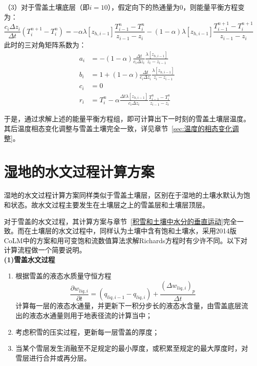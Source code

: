 （3）对于雪盖土壤底层（即$i=10$），假定向下的热通量为0，则能量平衡方程变为：
\begin{equation}
    \frac{c_{i} \Delta z_{i}}{\Delta t}\left(T_{i}^{n+1}-T_{i}^{n}\right)=-\alpha \lambda\left[z_{h, i-1}\right] \frac{T_{i-1}^{n}-T_{i}^{n}}{z_{i-1}-z_{i}}-(1-\alpha) \lambda\left[z_{h, i-1}\right] \frac{T_{i-1}^{n+1}-T_{i}^{n+1}}{z_{i-1}-z_{i}}
\end{equation}
此时的三对角矩阵系数为：
\begin{equation}
\begin{aligned}
a_{i} &= -(1-\alpha) \frac{\Delta t}{c_{i} \Delta z_{i}} \frac{\lambda\left[z_{h, i-1}\right]}{z_{i}-z_{i-1}} \\
b_{i} &= 1+(1-\alpha) \frac{\Delta t}{c_{i} \Delta z_{i}} \frac{\lambda\left[z_{h, i-1}\right]}{z_{i}-z_{i-1}} \\
c_{i} &= 0 \\
r_{i} &= T_{i}^{n}-\alpha \frac{\Delta t \lambda\left[z_{h, i-1}\right]}{c_{i} \Delta z_{i}} \frac{T_{i-1}^{n}-T_{i}^{n}}{z_{i-1}-z_{i}}
\end{aligned}
\end{equation}

于是，通过求解上述的能量平衡方程组，即可计算出下一时刻的雪盖土壤层温度。其后温度相态变化调整与雪盖土壤完全一致，详见章节~\ref{sec:温度的相态变化调整}。


\section{湿地的水文过程计算方案}
湿地的水文过程计算方案同样类似于雪盖土壤层，区别在于湿地的土壤水默认为饱和状态。故水文过程主要发生在土壤层之上的雪盖层和土壤层顶层。

对于雪盖的水文过程，其计算方案与章节~\ref{积雪和土壤中水分的垂直运动}完全一致。而在土壤层的水文过程中，同样认为土壤中含有饱和土壤水，采用2014版CoLM中的方案和用可变饱和流数值算法求解Richards方程时有少许不同。以下对计算流程做一个简要说明。\\

\textbf {(1)雪盖水文过程}\\

\begin{enumerate}
    \item 根据雪盖的液态水质量守恒方程
    \begin{equation}
            \frac{\partial w_{liq,i}}{\partial t}=\left(q_{liq,i-1}-q_{liq,i}\right)+\frac{{\left(\Delta w_{liq,i}\right)}_p}{\Delta t}
    \end{equation}
    计算每一层的液态水通量，并更新下一积分步长的液态水含量，由雪盖底层流出的液态水通量则用于地表径流的计算当中；
    \item 考虑积雪的压实过程，更新每一层雪盖的厚度；
    \item 当某个雪层发生消融至不足规定的最小厚度，或积累至规定的最大厚度时，对雪层进行合并或再分层。
\end{enumerate}


